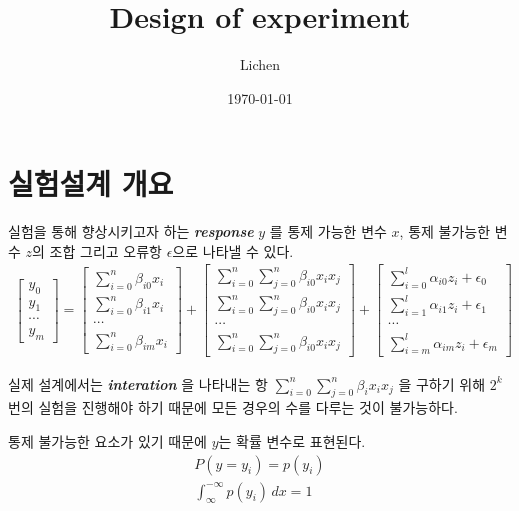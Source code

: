 \documentclass{article}
\author{Lichen}
\date{\today}
\title{Design of experiment}
\begin{document}
\begin{titlepage}
    \maketitle
\end{titlepage}
    \section{실험설계 개요}
    실험을 통해 향상시키고자 하는 \textbf{\textit{response}} $y$ 를 통제 가능한 변수 $x$, 통제 불가능한 변수 $z$의 조합 그리고 오류항 $\epsilon$으로 나타낼 수 있다.
    \begin{align}
        \begin{bmatrix}
            y_0 \\ y_1 \\ \cdots \\ y_m
        \end{bmatrix} =
        \begin{bmatrix}
             \sum^n_{i=0}\beta_{i0} x_i\\
             \sum^n_{i=0}\beta_{i1} x_i\\
             \cdots\\
             \sum^n_{i=0}\beta_{im} x_i
        \end{bmatrix} 
        +\begin{bmatrix}
            \sum^n_{i=0}\sum^n_{j=0}\beta_{i0} x_i x_j\\
            \sum^n_{i=0}\sum^n_{j=0}\beta_{i0} x_i x_j\\
            \cdots\\
            \sum^n_{i=0}\sum^n_{j=0}\beta_{i0} x_i x_j
        \end{bmatrix}
        +\begin{bmatrix}
            \sum^l_{i=0}\alpha_{i0} z_i+\epsilon_0\\
            \sum^l_{i=1}\alpha_{i1} z_i+\epsilon_1\\
            \cdots\\
            \sum^l_{i=m}\alpha_{im} z_i+\epsilon_m
        \end{bmatrix}
    \end{align}
    
    실제 설계에서는 \textbf{\textit{interation}} 을 나타내는 항 $\sum^n_{i=0}\sum^n_{j=0}\beta_{i} x_i x_j$ 을 구하기 위해 $2^k$ 번의 실험을 진행해야 하기 때문에 모든 경우의 수를 다루는 것이 불가능하다. 

    통제 불가능한 요소가 있기 때문에 $y$는 확률 변수로 표현된다. 
    \begin{align}
        P(y=y_i) = p(y_i)\\
        \int_{\infty}^{-\infty} p(y_i) \,dx = 1
    \end{align}
    
\end{document}
